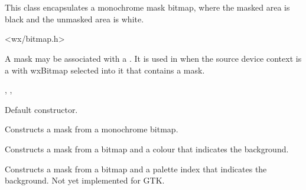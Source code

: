 \section{}\label{wxmask}

This class encapsulates a monochrome mask bitmap, where the masked area is black and
the unmasked area is white.




<wx/bitmap.h>


A mask may be associated with a . It is used in  when
the source device context is a  with wxBitmap selected into it that
contains a mask.


, , 


\label{wxmaskconstr}


Default constructor.


Constructs a mask from a monochrome bitmap.



Constructs a mask from a bitmap and a colour that indicates the background.



Constructs a mask from a bitmap and a palette index that indicates the background. Not
yet implemented for GTK.





